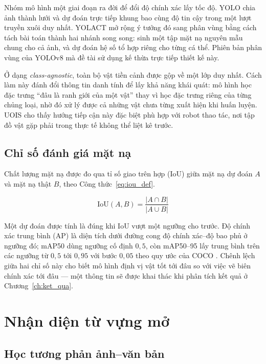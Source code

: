 Nhóm mô hình một giai đoạn ra đời để đổi độ chính xác lấy tốc độ. YOLO \cite{redmon2016yolo}
chia ảnh thành lưới và dự đoán trực tiếp khung bao cùng độ tin cậy trong một lượt truyền xuôi
duy nhất. YOLACT \cite{bolya2019yolact} mở rộng ý tưởng đó sang phân vùng bằng cách tách bài
toán thành hai nhánh song song: sinh một tập mặt nạ nguyên mẫu chung cho cả ảnh, và dự đoán hệ
số tổ hợp riêng cho từng cá thể. Phiên bản phân vùng của YOLOv8 \cite{jocher2023yolov8} mà đề
tài sử dụng kế thừa trực tiếp thiết kế này.

Ở dạng \emph{class-agnostic}, toàn bộ vật tiền cảnh được gộp về một lớp duy nhất. Cách làm này
đánh đổi thông tin danh tính để lấy khả năng khái quát: mô hình học đặc trưng ``đâu là ranh giới
của một vật'' thay vì học đặc trưng riêng của từng chủng loại, nhờ đó xử lý được cả những vật
chưa từng xuất hiện khi huấn luyện. UOIS \cite{xie2021uois} cho thấy hướng tiếp cận này đặc biệt
phù hợp với robot thao tác, nơi tập đồ vật gặp phải trong thực tế không thể liệt kê trước.

\subsection{Chỉ số đánh giá mặt nạ}

Chất lượng mặt nạ được đo qua tỉ số giao trên hợp (IoU) giữa mặt nạ dự đoán $A$ và mặt nạ thật
$B$, theo Công thức~\eqref{eq:iou_def}.

\begin{equation}
\label{eq:iou_def}
\mathrm{IoU}(A,B) = \frac{|A \cap B|}{|A \cup B|}
\end{equation}

Một dự đoán được tính là đúng khi IoU vượt một ngưỡng cho trước. Độ chính xác trung bình (AP) là
diện tích dưới đường cong độ chính xác--độ bao phủ ở ngưỡng đó; mAP50 dùng ngưỡng cố định
$0{,}5$, còn mAP50--95 lấy trung bình trên các ngưỡng từ $0{,}5$ tới $0{,}95$ với bước $0{,}05$
theo quy ước của COCO \cite{lin2014coco}. Chênh lệch giữa hai chỉ số này cho biết mô hình định
vị vật tốt tới đâu so với việc vẽ biên chính xác tới đâu --- một thông tin sẽ được khai thác khi
phân tích kết quả ở Chương~\ref{ch:ket_qua}.

\section{Nhận diện từ vựng mở}

\subsection{Học tương phản ảnh--văn bản}


